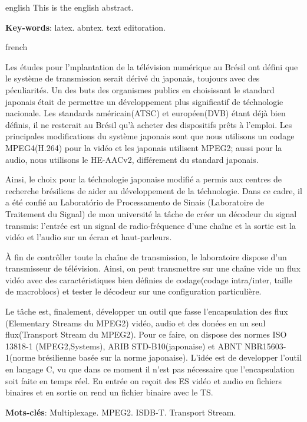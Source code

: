 \documentclass[
	12pt,				%
	openright,			%
	twoside,			%
	a4paper,			%
	brazil,
	french,				%
	english
	]{abntex2}
\begin{document}
\begin{resumo}[Abstract]
 \begin{otherlanguage*}{english}
   This is the english abstract.

   \vspace{\onelineskip}
 
   \noindent 
   \textbf{Key-words}: latex. abntex. text editoration.
 \end{otherlanguage*}
\end{resumo}

\begin{resumo}[Résumé]
 \begin{otherlanguage*}{french}
 
 Les études pour l'mplantation de la télévision numérique au Brésil ont défini que le système de transmission serait dérivé du japonais, toujours avec des péculiarités. Un des buts des organismes publics en choisissant le standard japonais était de permettre un développement plus significatif de téchnologie nacionale. Les standards américain(ATSC) et européen(DVB) étant déjà bien définis, il ne resterait au Brésil qu'à acheter des dispositifs prêts à l'emploi. Les principales modifications du système japonais sont que nous utilisons un codage MPEG4(H.264) pour la vidéo et les japonais utilisent MPEG2; aussi pour la audio, nous utilisons le HE-AACv2, différement du standard japonais.

Ainsi, le choix pour la téchnologie japonaise modifié a permis aux centres de recherche brésiliens de aider au développement de la téchnologie. Dans ce cadre, il a été confié au Laboratório de Processamento de Sinais (Laboratoire de Traitement du Signal) de mon université la tâche de créer un décodeur du signal transmis: l'entrée est un signal de radio-fréquence d'une chaîne et la sortie est la vidéo et l'audio sur un écran et haut-parleurs.

À fin de contrôller toute la chaîne de transmission, le laboratoire dispose d'un transmisseur de télévision. Ainsi, on peut transmettre sur une chaîne vide un flux vidéo avec des caractéristiques bien définies de codage(codage intra/inter, taille de macroblocs) et tester le décodeur sur une configuration particulière.

Le tâche est, finalement, développer un outil que fasse l'encapsulation des flux (Elementary Streams du MPEG2) vidéo, audio et des donées en un seul flux(Transport Stream du MPEG2). Pour ce faire, on dispose des normes ISO 13818-1 (MPEG2,Systems), ARIB STD-B10(japonaise) et ABNT NBR15603-1(norme brésilienne basée sur la norme japonaise). L'idée est de developper l'outil en langage C, vu que dans ce moment il n'est pas nécessaire que l'encapsulation soit faite en temps réel. En entrée on reçoit des ES vidéo et audio en fichiers binaires et en sortie on rend un fichier binaire avec le TS.

   \textbf{Mots-clés}: Multiplexage. MPEG2. ISDB-T. Transport Stream.
 \end{otherlanguage*}
\end{resumo}
\end{document}
